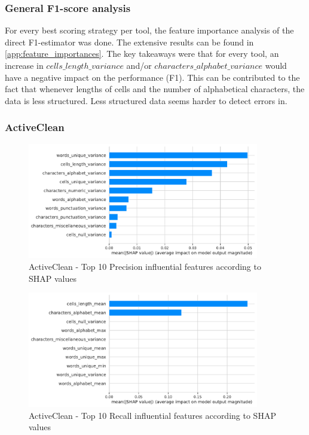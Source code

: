 \subsubsection{General F1-score analysis}
For every best scoring strategy per tool, the feature importance analysis of the direct F1-estimator was done. The extensive results can be found in \autoref{app:feature_importances}. 
The key takeaways were that for every tool, an increase in $cells\_length\_variance$ and/or  $characters\_alphabet\_variance$ would have a negative impact on the performance (F1).
This can be contributed to the fact that whenever lengths of cells and the number of alphabetical characters, the data is less structured. Less structured data seems harder to detect errors in.


\subsubsection{ActiveClean}
\begin{figure}[H]
    \centering
    \includegraphics[width=0.9\textwidth]{thesis/Figures/RQ4/Shap_cell_prec_ActiveClean.pdf}
    \caption{ActiveClean - Top 10 Precision influential features according to SHAP values}
    \label{fig:feature_importance_prec_ActiveClean}
\end{figure}
\begin{figure}[H]
    \centering
    \includegraphics[width=0.9\textwidth]{thesis/Figures/RQ4/Shap_cell_rec_ActiveClean.pdf}
    \caption{ActiveClean - Top 10 Recall influential features according to SHAP values}
    \label{fig:feature_importance_rec_ActiveClean}
\end{figure}

